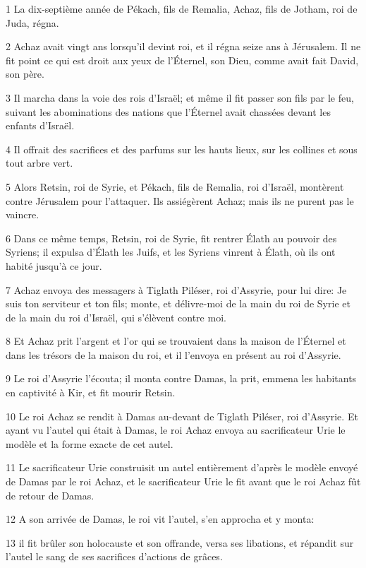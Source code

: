 \par 1 La dix-septième année de Pékach, fils de Remalia, Achaz, fils de Jotham, roi de Juda, régna.
\par 2 Achaz avait vingt ans lorsqu'il devint roi, et il régna seize ans à Jérusalem. Il ne fit point ce qui est droit aux yeux de l'Éternel, son Dieu, comme avait fait David, son père.
\par 3 Il marcha dans la voie des rois d'Israël; et même il fit passer son fils par le feu, suivant les abominations des nations que l'Éternel avait chassées devant les enfants d'Israël.
\par 4 Il offrait des sacrifices et des parfums sur les hauts lieux, sur les collines et sous tout arbre vert.
\par 5 Alors Retsin, roi de Syrie, et Pékach, fils de Remalia, roi d'Israël, montèrent contre Jérusalem pour l'attaquer. Ils assiégèrent Achaz; mais ils ne purent pas le vaincre.
\par 6 Dans ce même temps, Retsin, roi de Syrie, fit rentrer Élath au pouvoir des Syriens; il expulsa d'Élath les Juifs, et les Syriens vinrent à Élath, où ils ont habité jusqu'à ce jour.
\par 7 Achaz envoya des messagers à Tiglath Piléser, roi d'Assyrie, pour lui dire: Je suis ton serviteur et ton fils; monte, et délivre-moi de la main du roi de Syrie et de la main du roi d'Israël, qui s'élèvent contre moi.
\par 8 Et Achaz prit l'argent et l'or qui se trouvaient dans la maison de l'Éternel et dans les trésors de la maison du roi, et il l'envoya en présent au roi d'Assyrie.
\par 9 Le roi d'Assyrie l'écouta; il monta contre Damas, la prit, emmena les habitants en captivité à Kir, et fit mourir Retsin.
\par 10 Le roi Achaz se rendit à Damas au-devant de Tiglath Piléser, roi d'Assyrie. Et ayant vu l'autel qui était à Damas, le roi Achaz envoya au sacrificateur Urie le modèle et la forme exacte de cet autel.
\par 11 Le sacrificateur Urie construisit un autel entièrement d'après le modèle envoyé de Damas par le roi Achaz, et le sacrificateur Urie le fit avant que le roi Achaz fût de retour de Damas.
\par 12 A son arrivée de Damas, le roi vit l'autel, s'en approcha et y monta:
\par 13 il fit brûler son holocauste et son offrande, versa ses libations, et répandit sur l'autel le sang de ses sacrifices d'actions de grâces.
